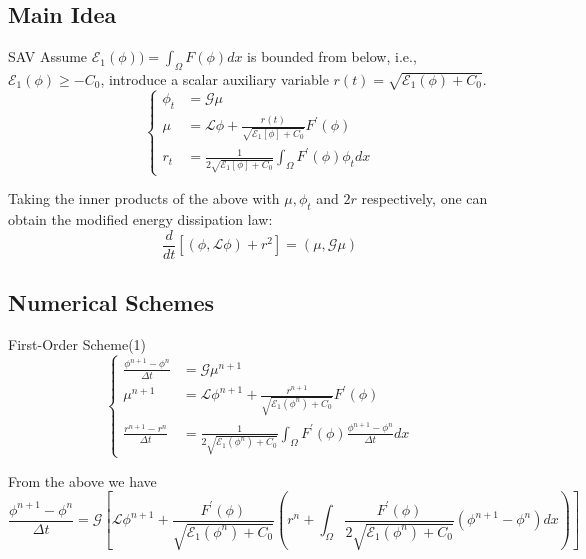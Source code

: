 \documentclass[9pt]{beamer}
\begin{document}
\subsection{Main Idea}

\begin{frame}{SAV}
Assume $\mathcal E_1(\phi)) = \int_{\Omega} F(\phi)dx$ is bounded from below, i.e., $\mathcal E_1(\phi) \geq -C_0$, introduce a scalar auxiliary variable $r(t) = \sqrt{\mathcal E_1(\phi) + C_0}$.
$$\left\{
\begin{aligned} \phi_t &=\mathcal G \mu \\ 
\mu &=\mathcal L \phi+\frac{r(t)}{\sqrt{\mathcal E_{1}[\phi]+C_{0}}} F^{\prime}(\phi) \\ 
r_t &=\frac{1}{2 \sqrt{\mathcal E_{1}[\phi]+C_{0}}} \int_{\Omega} F^{\prime}(\phi) \phi_{t} d x 
\end{aligned}
\right.$$

Taking the inner products of the above with $\mu, \phi_t$ and $2r$ respectively, one can obtain the modified energy dissipation law:
$$
\frac{d}{d t}\left[(\phi, \mathcal{L} \phi)+r^{2}\right]=(\mu, \mathcal{G} \mu)
$$
\end{frame}

\subsection{Numerical Schemes}

\begin{frame}{First-Order Scheme(1)}
$$\left\{
\begin{aligned}
\frac{\phi^{n+1}-\phi^{n}}{\Delta t} &=\mathcal{G} \mu^{n+1} \\
\mu^{n+1} &=\mathcal{L} \phi^{n+1}+\frac{r^{n+1}}{\sqrt{\mathcal{E}_{1}(\phi^{n})+C_0}} F^{\prime}(\phi)\\
\frac{r^{n+1}-r^{n}}{\Delta t} &=\frac{1}{2 \sqrt{\mathcal{E}_{1}(\phi^{n})+C_0}} \int_{\Omega} F^{\prime}(\phi)\frac{\phi^{n+1}-\phi^{n}}{\Delta t} dx
\end{aligned}
\right.$$

From the above we have
$$
\frac{\phi^{n+1}-\phi^{n}}{\Delta t}=\mathcal{G}\left[\mathcal{L} \phi^{n+1}+\frac{F^{\prime}(\phi)}{\sqrt{\mathcal{E}_{1}(\phi^{n})+C_0}}\left(r^{n}+\int_{\Omega} \frac{F^{\prime}(\phi)}{2 \sqrt{\mathcal{E}_{1}(\phi^{n})+C_0}}\left(\phi^{n+1}-\phi^{n}\right) dx \right)\right]
$$
\end{frame}
\end{document}
